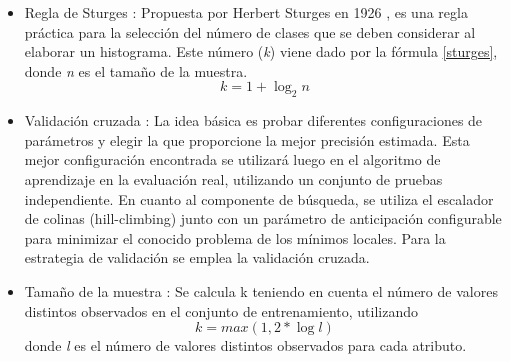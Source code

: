\begin{itemize}
	
	\item Regla de Sturges \citep{coria2013mineria}: Propuesta por Herbert Sturges en 1926 \citep{sturges1926choice}, es una regla práctica para la selección del número de clases que se deben considerar al elaborar un histograma. Este número (\textit{k}) viene dado por la fórmula \ref{sturges}, donde \textit{n} es el tamaño de la muestra.
	\begin{equation} \label{sturges}
		k = 1 + \log_{2} n
	\end{equation}
	
	\item Validación cruzada \citep{torgo1997search}: La idea básica es probar diferentes configuraciones de parámetros y elegir la que proporcione la mejor precisión estimada. Esta mejor configuración encontrada se utilizará luego en el algoritmo de aprendizaje en la evaluación real, utilizando un conjunto de pruebas independiente. En cuanto al componente de búsqueda, se utiliza el escalador de colinas (hill-climbing) junto con un parámetro de anticipación configurable para minimizar el conocido problema de los mínimos locales. Para la estrategia de validación se emplea la validación cruzada.
	
	\item Tamaño de la muestra \citep{dougherty1995supervised}: Se calcula k teniendo en cuenta el número de valores distintos observados en el conjunto de entrenamiento, utilizando
	\begin{equation}
		k = max(1, 2 * \log l )
	\end{equation}
	donde \textit{l} es el número de valores distintos observados para cada atributo.
	
\end{itemize}

